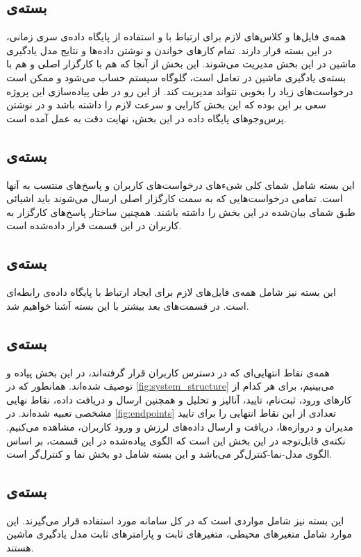 \subsection{بسته‌ی }
همه‌ی فایل‌ها و کلاس‌های لازم برای ارتباط با و استفاده از پایگاه داده‌ی سری زمانی، در این بسته قرار دارند. تمام کارهای خواندن و نوشتن داده‌ها و نتایج مدل یادگیری ماشین در این بخش مدیریت می‌شوند. این بخش از آنجا که هم با کارگزار اصلی و هم با بسته‌ی یادگیری ماشین در تعامل است، گلوگاه سیستم حساب می‌شود و ممکن است درخواست‌های زیاد را بخوبی نتواند مدیریت کند. از این رو در طی پیاده‌سازی این پروژه سعی بر این بوده که این بخش کارایی و سرعت لازم را داشته‌ باشد و در نوشتن پرس‌وجوهای پایگاه داده در این بخش، نهایت دقت به عمل آمده است.

\subsection{بسته‌ی }
این بسته شامل شمای کلی شی‌ء‌های در‌خواست‌های کاربران و پاسخ‌های منتسب به آنها است\cite{deacon2009model}. تمامی درخواست‌هایی که به سمت کارگزار اصلی ارسال می‌شوند باید اشیائی طبق شمای بیان‌شده در این بخش را داشته‌ باشند. همچنین ساختار پاسخ‌های کارگزار به کاربران در این قسمت قرار داده‌شده است.

\subsection{بسته‌ی }
این بسته نیز شامل همه‌ی فایل‌های لازم برای ایجاد ارتباط با پایگاه‌ داده‌ی رابطه‌ای است. در قسمت‌های بعد بیشتر با این بسته آشنا خواهیم شد.

\subsection{بسته‌ی }
همه‌ی نقاط انتهایی‌ای که در دسترس کاربران قرار گرفته‌اند، در این بخش پیاده و توصیف شده‌اند. همانطور که در \cref{fig:system_structure} می‌بینیم، برای هر کدام از کارهای ورود، ثبت‌نام، تایید، آنالیز و تحلیل و همچنین ارسال و دریافت داده، نقاط نهایی مشخصی تعبیه ‌شده‌اند. در \cref{fig:endpoints} تعدادی از این نقاط انتهایی را برای تایید مدیران و دروازه‌ها، دریافت و ارسال داده‌های لرزش و ورود کاربران، مشاهده می‌کنیم. نکته‌ی قابل‌توجه در این بخش این است که الگوی پیاده‌شده در این قسمت، بر اساس الگوی مدل-نما-کنترل‌گر\cite{deacon2009model} می‌باشد و این بسته شامل دو بخش نما و کنترل‌گر است.

\subsection{بسته‌ی }
این بسته نیز شامل مواردی است که در کل سامانه مورد استفاده قرار می‌گیرند. این موارد شامل متغیر‌های محیطی، متغیر‌های ثابت و پارامتر‌های ثابت مدل یادگیری ماشین هستند.


